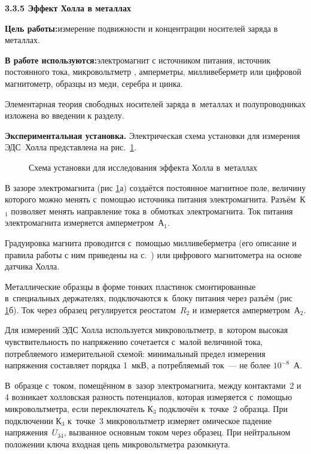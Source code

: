 {\large \bf 3.3.5 Эффект Холла в металлах}

{\bf Цель работы:}{измерение подвижности и концентрации носителей заряда в металлах.}

{\bf В работе используются:}{электромагнит с источником питания, источник постоянного тока, микровольтметр , амперметры, милливеберметр или цифровой магнитометр, образцы из меди, серебра и цинка.}

Элементарная теория свободных носителей заряда в~металлах и полупроводниках изложена во введении к разделу.

{\bf Экспериментальная установка.} Электрическая схема установки для измерения ЭДС~Холла представлена на рис.~\ref{fig3.5.1}.

\begin{figure}
\caption{Схема установки для исследования эффекта Холла в~металлах}
\label{fig3.5.1}
\end{figure}

В зазоре электромагнита (рис \ref{fig3.5.1}а) создаётся постоянное магнитное поле, величину которого можно менять с~помощью источника питания электромагнита. Разъём~К$_1$ позволяет менять направление тока в~обмотках электромагнита. Ток питания электромагнита измеряется амперметром~А$_1$.

Градуировка магнита проводится с~помощью милливеберметра (его описание и правила работы с ним приведены на с.~\pageref{MWB}) или цифрового магнитометра на основе датчика Холла.

Металлические образцы в форме тонких пластинок смонтированные в~специальных держателях, подключаются к~блоку питания через разъём (рис \ref{fig3.5.1}б). Ток через образец регулируется реостатом~$R_2$ и измеряется амперметром~А$_2$.

Для измерений ЭДС Холла используется микровольтметр, в~котором высокая чувствительность по напряжению сочетается с~малой величиной тока, потребляемого измерительной схемой: минимальный предел измерения напряжения составляет порядка 1~мкВ, а потребляемый ток~--- не более $10^{-8}$~А.

В~образце с~током, помещённом в~зазор электромагнита, между контактами~2 и 4 возникает холловская разность потенциалов, которая измеряется с~помощью микровольтметра, если переключатель К$_3$ подключён к~точке~2 образца. При подключении К$_3$ к~точке~3 микровольтметр измеряет омическое падение напряжения~$U_{34}$, вызванное основным током через образец. При нейтральном положении ключа входная цепь микровольтметра разомкнута.

